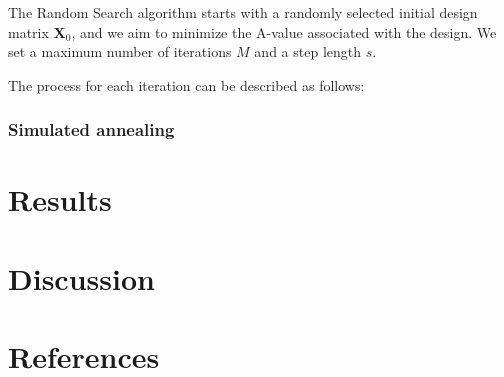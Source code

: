 \documentclass[
  a4paper,
  oneside,
  openany,
  12pt,
  onecolumn]{book}
\theoremstyle{plain}
\theoremstyle{definition}
\theoremstyle{remark}
\begin{document}
The Random Search algorithm starts with a randomly selected initial
design matrix \(\boldsymbol{X}_0\), and we aim to minimize the A-value
associated with the design. We set a maximum number of iterations \(M\)
and a step length \(s\).

The process for each iteration can be described as follows:

\subsection{Simulated annealing}\label{simulated-annealing}


\chapter{Results}\label{sec-results}


\chapter{Discussion}\label{sec-discuss}


\chapter*{References}\label{references}


\renewcommand{\bibsection}{}



\backmatter
\end{document}
